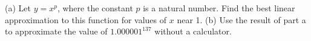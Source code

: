 (a) Let $y=x^p$, where the constant $p$ is a natural number.
Find the best linear approximation to this function for values of
$x$ near 1.\answercheck\hwendpart
(b) Use the result of part a to approximate the value of
$1.000001^{137}$ without a calculator.\answercheck\hwendpart
